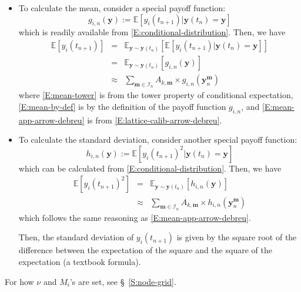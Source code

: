 \documentclass{texyise}
\newcommand{\indexset}{\mathcal{I}}
\begin{document}
\begin{itemize}
    \item To calculate the mean, consider a special payoff function:
    \begin{equation}
    g_{i,n}(\bm{y}) := \mathbb{E}[y_i(t_{n+1}) | \bm{y}(t_n) = \bm{y}]
    \end{equation}
    which is readily available from \eqref{E:conditional-distribution}.
    Then, we have
    \begin{eqnarray}
        \mathbb{E}[y_i(t_{n+1})] & = & \mathbb{E}_{\bm{y}\sim\bm{y}(t_n)}[\mathbb{E}[y_i(t_{n+1}) | \bm{y}(t_n) = \bm{y}]] \label{E:mean-tower}\\
                  & = & \mathbb{E}_{\bm{y}\sim\bm{y}(t_n)}[g_{i,n}(\bm{y})] \label{E:mean-by-def}\\
                  & \approx & \sum_{\bm{m} \in \indexset_n} A_{k, \bm{m}} \times g_{i,n}(\bm{y}_{n}^{\bm{m}}) \label{E:mean-app-arrow-debreu} 
    \end{eqnarray}
    where \eqref{E:mean-tower} is from the tower property of conditional expectation, \eqref{E:mean-by-def} is by the definition of the payoff function $g_{i,n}$, and \eqref{E:mean-app-arrow-debreu} is from \eqref{E:lattice-calib-arrow-debreu}.
    \item To calculate the standard deviation, consider another special payoff function:
    \begin{equation}
        h_{i,n}(\bm{y}) := \mathbb{E}[y_i(t_{n+1})^2|\bm{y}(t_n)= \bm{y}] 
    \end{equation}
    which can be calculated from \eqref{E:conditional-distribution}. Then, we have
    \begin{eqnarray}
        \mathbb{E}[y_i(t_{n+1})^2] & = & \mathbb{E}_{\bm{y}\sim\bm{y}(t_n)}[h_{i,n}(\bm{y})] \label{E:variance-by-def}\\
                  & \approx & \sum_{\bm{m} \in \indexset_n} A_{k, \bm{m}} \times h_{i,n}(\bm{y}_{n}^{\bm{m}}) \label{E:variance-app-arrow-debreu}
    \end{eqnarray} 
    which follows the same reasoning as \eqref{E:mean-app-arrow-debreu}.

    Then, the standard deviation of $y_i(t_{n+1})$ is given by the square root of the difference between the expectation of the square and the square of the expectation (a textbook formula). 
\end{itemize}

For how $\nu$ and $M_i$'s are set, see \S~\ref{S:node-grid}.
\end{document}
